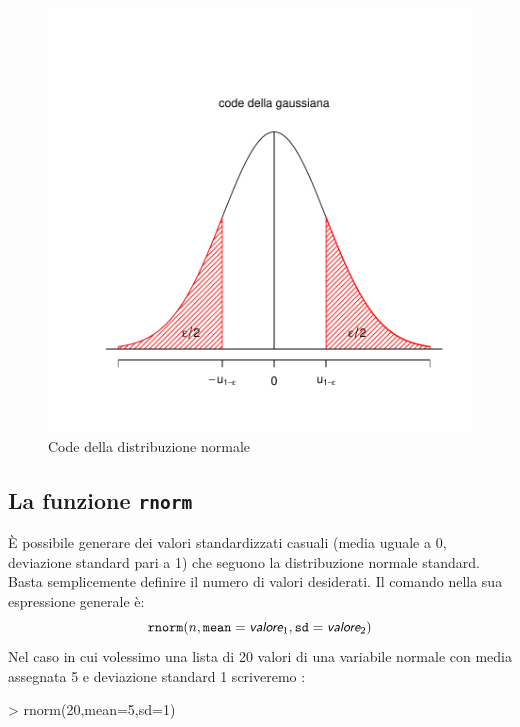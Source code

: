 \documentclass[onecolumn,12pt]{book}
\newcommand{\varia}[1]{\textsl{\textsf{#1}}}
\begin{document}
\begin{figure}[htbp]
\begin{center}
\includegraphics{RbookParte2-077}
\caption{Code della distribuzione normale}
\label{fig:normaletratto}
\end{center}
\end{figure}

 \subsection{La funzione \texttt{rnorm}}
\`E possibile generare dei valori standardizzati casuali (media uguale a 0, deviazione standard pari a 1) che seguono la distribuzione normale standard. Basta semplicemente definire il numero di valori desiderati.
Il comando nella sua espressione generale \`e:
\begin{equation}\texttt{rnorm}(n,\texttt{mean}=\varia{valore}_1,\texttt{sd}=\varia{valore}_2)\end{equation}
Nel caso in cui volessimo una lista di 20 valori di una variabile normale con media assegnata 5 e deviazione standard 1 scriveremo :

\begin{Schunk}
\begin{Sinput}
> rnorm(20,mean=5,sd=1)
\end{Sinput}
\end{Schunk}
\end{document}
